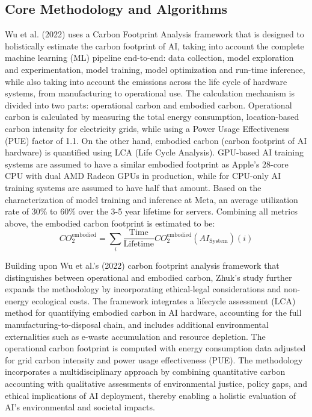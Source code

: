 \documentclass[a4paper, 12pt]{article}
\begin{document}
\subsection{Core Methodology and Algorithms} 
\hspace{24pt}Wu et al. (2022) uses a Carbon Footprint Analysis framework that is designed to holistically estimate the carbon footprint of AI, taking into account the complete machine learning (ML) pipeline end-to-end: data collection, model exploration and experimentation, model training, model optimization and run-time inference, while also taking into account the emissions across the life cycle of hardware systems, from manufacturing to operational use. The calculation mechanism is divided into two parts: operational carbon and embodied carbon. Operational carbon is calculated by measuring the total energy consumption, location-based carbon intensity for electricity grids, while using a Power Usage Effectiveness (PUE) factor of 1.1. On the other hand, embodied carbon (carbon footprint of AI hardware) is quantified using LCA (Life Cycle Analysis). GPU-based AI training systems are assumed to have a similar embodied footprint as Apple's 28-core CPU with dual AMD Radeon GPUs in production, while for CPU-only AI training systems are assumed to have half that amount.  Based on the characterization of model training and inference at Meta, an average utilization rate of 30\% to 60\% over the 3-5 year lifetime for servers. Combining all metrics above, the embodied carbon footprint is estimated to be: 
\begin{equation}
	CO_2^{\text{embodied}} = \sum_i \frac{\text{Time}}{\text{Lifetime}} CO_2^{\text{embodied}}(AI_{\text{System}})(i)
\end{equation}

\hspace{24pt}Building upon Wu et al.'s (2022) carbon footprint analysis framework that distinguishes between operational and embodied carbon, Zhuk's study further expands the methodology by incorporating ethical-legal considerations and non-energy ecological costs. The framework integrates a lifecycle assessment (LCA) method for quantifying embodied carbon in AI hardware, accounting for the full manufacturing-to-disposal chain, and includes additional environmental externalities such as e-waste accumulation and resource depletion. The operational carbon footprint is computed with energy consumption data adjusted for grid carbon intensity and power usage effectiveness (PUE). The methodology incorporates a multidisciplinary approach by combining quantitative carbon accounting with qualitative assessments of environmental justice, policy gaps, and ethical implications of AI deployment, thereby enabling a holistic evaluation of AI's environmental and societal impacts.
\end{document}
